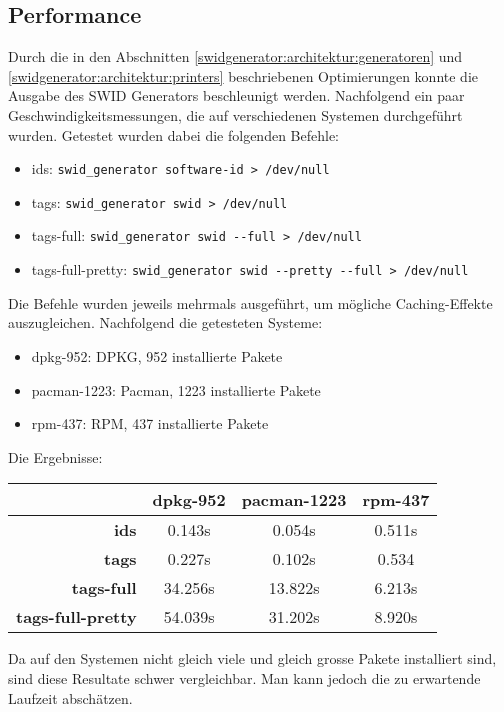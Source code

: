 \subsection{Performance}

Durch die in den Abschnitten \ref{swidgenerator:architektur:generatoren} und
\ref{swidgenerator:architektur:printers} beschriebenen Optimierungen konnte die
Ausgabe des SWID Generators beschleunigt werden. Nachfolgend ein paar
Geschwindigkeitsmessungen, die auf verschiedenen Systemen durchgeführt wurden.
Getestet wurden dabei die folgenden Befehle:

\begin{itemize}
	\item ids: \texttt{swid\_generator software-id > /dev/null}
	\item tags: \texttt{swid\_generator swid > /dev/null}
	\item tags-full: \texttt{swid\_generator swid -{}-full > /dev/null}
	\item tags-full-pretty: \texttt{swid\_generator swid -{}-pretty -{}-full > /dev/null}
\end{itemize}

Die Befehle wurden jeweils mehrmals ausgeführt, um mögliche Caching-Effekte
auszugleichen. Nachfolgend die getesteten Systeme:

\begin{itemize}
	\item dpkg-952: DPKG, 952 installierte Pakete
	\item pacman-1223: Pacman, 1223 installierte Pakete
	\item rpm-437: RPM, 437 installierte Pakete
\end{itemize}

Die Ergebnisse:

\begin{tabularx}{\textwidth}{rCCC}
	& \textbf{dpkg-952} & \textbf{pacman-1223} & rpm-437 \\
	\hline
	\textbf{ids} & 0.143s & 0.054s & 0.511s \\
	\hline
	\textbf{tags} & 0.227s & 0.102s & 0.534\\
	\hline
	\textbf{tags-full} & 34.256s & 13.822s & 6.213s \\
	\hline
	\textbf{tags-full-pretty} & 54.039s & 31.202s & 8.920s \\
	\hline
\end{tabularx}

Da auf den Systemen nicht gleich viele und gleich grosse Pakete installiert
sind, sind diese Resultate schwer vergleichbar. Man kann jedoch die zu
erwartende Laufzeit abschätzen.

